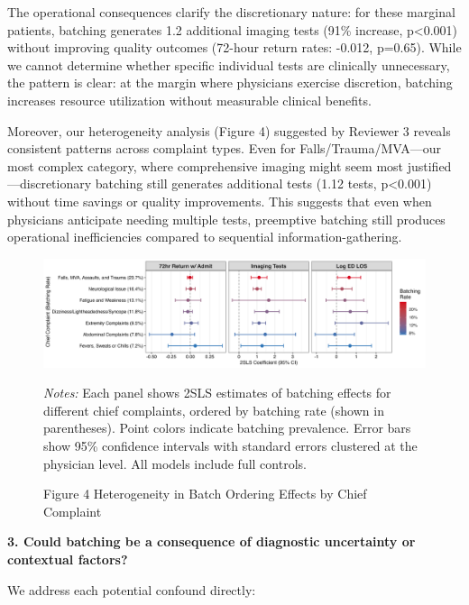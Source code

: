 \documentclass[11pt]{article}
\newcommand{\1}{\hbox{\rm 1\kern-.35em 1}}
\begin{document}
The operational consequences clarify the discretionary nature: for these marginal patients, batching generates 1.2 additional imaging tests (91\% increase, p<0.001) without improving quality outcomes (72-hour return rates: -0.012, p=0.65). While we cannot determine whether specific individual tests are clinically unnecessary, the pattern is clear: at the margin where physicians exercise discretion, batching increases resource utilization without measurable clinical benefits.

Moreover, our heterogeneity analysis (Figure 4) suggested by Reviewer 3 reveals consistent patterns across complaint types. Even for Falls/Trauma/MVA—our most complex category, where comprehensive imaging might seem most justified—discretionary batching still generates additional tests (1.12 tests, p<0.001) without time savings or quality improvements. This suggests that even when physicians anticipate needing multiple tests, preemptive batching still produces operational inefficiencies compared to sequential information-gathering.

\begin{figure}[h]
\centering
\caption*{Figure 4  Heterogeneity in Batch Ordering Effects by Chief Complaint}
\begin{threeparttable}
\includegraphics[width=\textwidth]{../outputs/figures/heterogeneity_by_complaint.png}    
\begin{tablenotes}
\small
\item \textit{Notes:} Each panel shows 2SLS estimates of batching effects for different chief complaints, ordered by batching rate (shown in parentheses). Point colors indicate batching prevalence. Error bars show 95\% confidence intervals with standard errors clustered at the physician level. All models include full controls.
\end{tablenotes}
\end{threeparttable}
\end{figure}

\textbf{3. Could batching be a consequence of diagnostic uncertainty or contextual factors?}

We address each potential confound directly:
\end{document}
